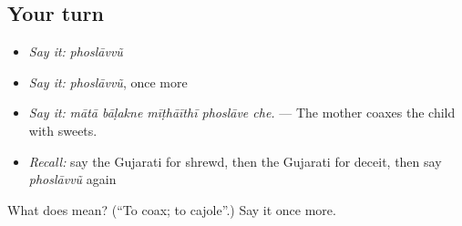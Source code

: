 \subsection*{Your turn}
\begin{itemize}
\raggedright
  \item \emph{Say it:} \emph{phoslāvvũ}
  \item \emph{Say it:} \emph{phoslāvvũ}, once more
  \item \emph{Say it:} \emph{mātā bāḷakne mīṭhāīthī phoslāve che.} — The mother coaxes the child with sweets.
  \item \emph{Recall:} say the Gujarati for shrewd, then the Gujarati for deceit, then say \emph{phoslāvvũ} again
\end{itemize}

\begin{tcolorbox}[breakable,colback=teal!4,colframe=teal!35!black,title={Before you move on}]
What does  mean? (\textquotedblleft{}To coax; to cajole\textquotedblright{}.) Say it once more.
\end{tcolorbox}
